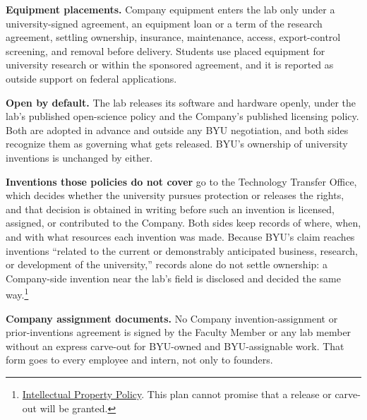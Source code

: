 \documentclass[11pt]{article}
\begin{document}
 \textbf{Equipment placements.} Company equipment enters the lab
only under a university-signed agreement, an equipment loan or a term of the
research agreement, settling ownership, insurance, maintenance, access,
export-control screening, and removal before delivery. Students use placed
equipment for university research or within
the sponsored agreement, and it is reported as outside support on federal
applications.


 \textbf{Open by default.} The lab releases its software and
hardware openly, under the lab's published open-science policy and the
Company's published licensing policy. Both are adopted in advance and outside
any BYU negotiation, and both sides recognize them as governing what gets
released. BYU's ownership of university inventions is unchanged by either.

 \textbf{Inventions those policies do not cover} go to the
Technology Transfer Office, which decides whether the university pursues
protection or releases the rights, and that decision is obtained in writing
before such an invention is licensed, assigned, or contributed to the Company.
Both sides keep records of where, when, and with what resources each invention
was made. Because BYU's claim reaches inventions ``related to the current or
demonstrably anticipated business, research, or development of the
university,'' records alone do not settle ownership: a Company-side invention
near the lab's field is disclosed and decided the same
way.\footnote{\href{https://policy.byu.edu/view/intellectual-property-policy}{Intellectual
Property Policy}. This plan cannot promise that a release or carve-out will be
granted.}

 \textbf{Company assignment documents.} No Company
invention-assignment or prior-inventions agreement is signed by the Faculty
Member or any lab member without an express carve-out for BYU-owned and
BYU-assignable work. That form goes to every employee and intern, not only to
founders.


\end{document}
